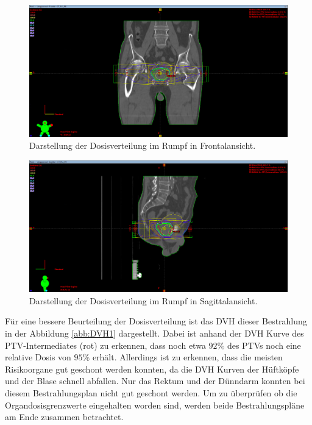 \begin{figure}[H]
  \centering
  \includegraphics[width=\textwidth]{Bilder/Prostata1_Y.png}
  \caption{Darstellung der Dosisverteilung im Rumpf in Frontalansicht.}
  \label{abb:Y1}
\end{figure}

\begin{figure}[H]
  \centering
  \includegraphics[width=\textwidth]{Bilder/Prostata1_X.png}
  \caption{Darstellung der Dosisverteilung im Rumpf in Sagittalansicht.}
  \label{abb:X1}
\end{figure}

Für eine bessere Beurteilung der Dosisverteilung ist das DVH dieser Bestrahlung in der
Abbildung \ref{abb:DVH1} dargestellt. Dabei ist anhand der DVH Kurve des PTV-Intermediates
(rot) zu erkennen, dass noch etwa $92\%$ des PTVs noch eine relative Dosis von $95\%$ erhält.
Allerdings ist zu erkennen, dass die meisten Risikoorgane gut geschont werden konnten, da
die DVH Kurven der Hüftköpfe und der Blase schnell abfallen. Nur das Rektum und der Dünndarm konnten bei
diesem Bestrahlungsplan nicht gut geschont werden. Um zu überprüfen ob die Organdosisgrenzwerte
eingehalten worden sind, werden beide Bestrahlungspläne am Ende zusammen betrachtet.

